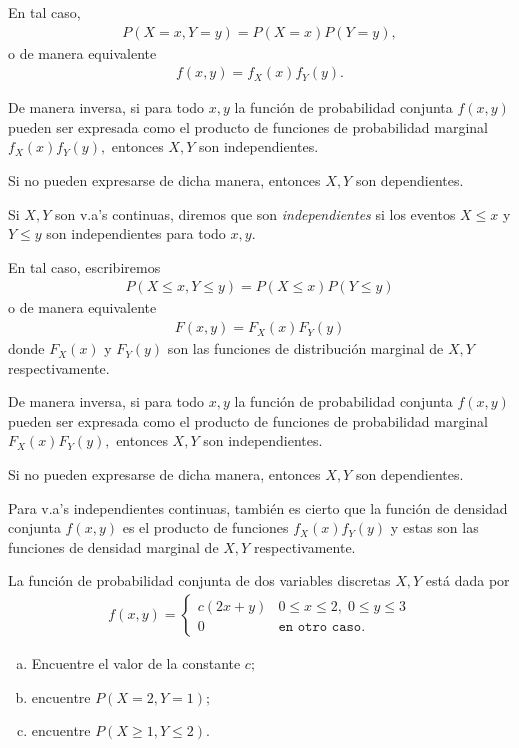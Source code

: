  En tal caso,
 \begin{align}
  \label{2.27}
  P(X=x,Y=y)=P(X=x)P(Y=y),
 \end{align}
o de manera equivalente
\begin{align}
 f(x,y)=f_{X}(x)f_{Y}(y).
\end{align}



 De manera inversa, si para todo $x,y$ la función de probabilidad conjunta $f(x,y)$ pueden ser expresada como el producto de funciones de probabilidad marginal $f_{X}(x)f_{Y}(y),$ entonces $X,Y$ son independientes.
 

 Si no pueden expresarse de dicha manera, entonces $X,Y$ son dependientes.


 Si $X,Y$ son v.a's continuas, diremos que son \emph{independientes} si los eventos $X\leq x$ y $Y\leq y$ son independientes para todo $x,y.$

 En tal caso, escribiremos
 \begin{align}
  \label{2.29}
  P(X\leq x, Y \leq y)=P(X\leq x)P(Y\leq y)
 \end{align} 
 o de manera equivalente
 \begin{align}
  F(x,y)=F_{X}(x)F_{Y}(y)
 \end{align}
 donde $F_{X}(x)$ y $F_{Y}(y)$ son las funciones de distribución marginal de $X,Y$ respectivamente.



 De manera inversa, si para todo $x,y$ la función de probabilidad conjunta $f(x,y)$ pueden ser expresada como el producto de funciones de probabilidad marginal $F_{X}(x)F_{Y}(y),$ entonces $X,Y$ son independientes.
 

 Si no pueden expresarse de dicha manera, entonces $X,Y$ son dependientes.


 Para v.a's independientes continuas, también es cierto que la función de densidad conjunta $f(x,y)$ es el producto de funciones $f_{X}(x)f_{Y}(y)$ y estas son las funciones de densidad marginal de $X,Y$ respectivamente.



 \begin{ejemplo}
  \label{sol:2.8}
  La función de probabilidad conjunta de dos variables discretas $X,Y$ está dada por
  \begin{align}
   f(x,y)=
   \begin{cases}
    c(2x+y) & 0\leq x \leq 2, \; 0 \leq y \leq 3 \\
    0 & \texttt{en otro caso}.
   \end{cases}
  \end{align}
  \begin{enumerate}[(a)]
   \item Encuentre el valor de la constante $c;$
   \item encuentre $P(X=2,Y=1);$
   \item encuentre $P(X\geq 1, Y\leq 2).$
  \end{enumerate}

 \end{ejemplo}



